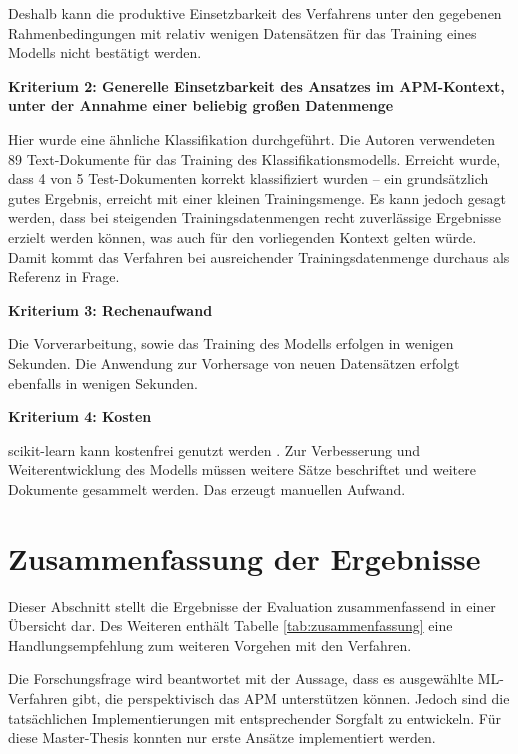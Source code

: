 Deshalb kann die produktive Einsetzbarkeit des Verfahrens unter den gegebenen Rahmenbedingungen mit relativ wenigen Datensätzen für das Training eines Modells nicht bestätigt werden.

{\bf Kriterium 2: Generelle Einsetzbarkeit des Ansatzes im APM-Kontext, unter der Annahme einer beliebig großen Datenmenge}

Hier \cite{Vogelsang} wurde eine ähnliche Klassifikation durchgeführt. Die Autoren verwendeten 89 Text-Dokumente für das Training des Klassifikationsmodells. Erreicht wurde, dass 4 von 5 Test-Dokumenten korrekt klassifiziert wurden – ein grundsätzlich gutes Ergebnis, erreicht mit einer kleinen Trainingsmenge. Es kann jedoch gesagt werden, dass bei steigenden Trainingsdatenmengen recht zuverlässige Ergebnisse erzielt werden können, was auch für den vorliegenden Kontext gelten würde. Damit kommt das Verfahren bei ausreichender Trainingsdatenmenge durchaus als Referenz in Frage. 

{\bf Kriterium 3: Rechenaufwand}

Die Vorverarbeitung, sowie das Training des Modells erfolgen in wenigen Sekunden. Die Anwendung zur Vorhersage von neuen Datensätzen erfolgt ebenfalls in wenigen Sekunden.

{\bf Kriterium 4: Kosten}

scikit-learn kann kostenfrei genutzt werden \cite{scikit-license}. Zur Verbesserung und Weiterentwicklung des Modells müssen weitere Sätze beschriftet und weitere Dokumente gesammelt werden. Das erzeugt manuellen Aufwand.

\section{Zusammenfassung der Ergebnisse}

Dieser Abschnitt stellt die Ergebnisse der Evaluation zusammenfassend in einer Übersicht dar. Des Weiteren enthält Tabelle \ref{tab:zusammenfassung} eine Handlungsempfehlung zum weiteren Vorgehen mit den Verfahren.

Die Forschungsfrage wird beantwortet mit der Aussage, dass es ausgewählte ML-Verfahren gibt, die perspektivisch das APM unterstützen können. Jedoch sind die tatsächlichen Implementierungen mit entsprechender Sorgfalt zu entwickeln. Für diese Master-Thesis konnten nur erste Ansätze implementiert werden.


